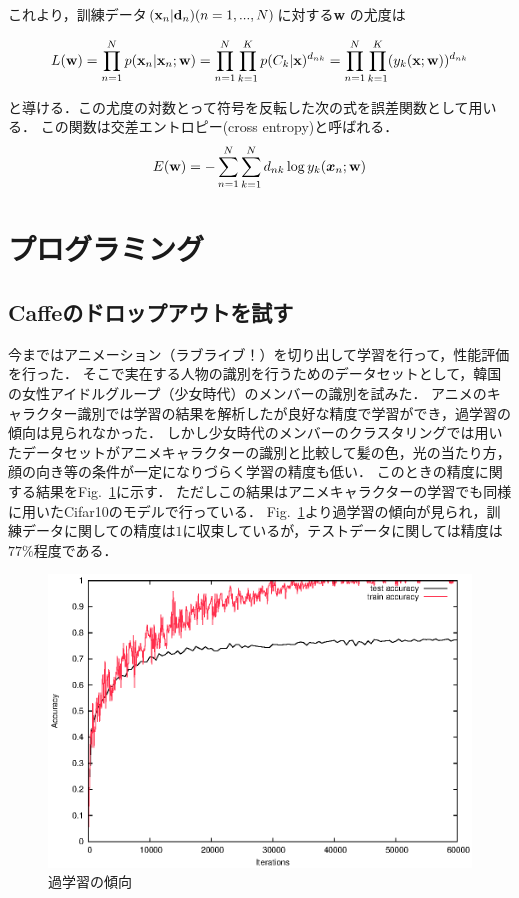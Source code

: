 \documentclass[a4paper,10pt]{jsarticle}
\def\vec#1{\mbox{\boldmath$#1$}}
\begin{document}
これより，訓練データ${({\bf x}_n|{\bf d}_n)}(n=1,...,N)$に対する{\bf w}
の尤度は

\begin{equation}
 L({\bf w})=\prod_{n=1}^{N}p({\bf x}_n|{\bf x}_n;{\bf
	w})=\prod_{n=1}^{N}\prod_{k=1}^{K}p(C_k|{\bf
	x})^{d_{nk}}=\prod_{n=1}^{N}\prod_{k=1}^{K}(y_k({\bf x};{\bf w}))^{d_{nk}}
\end{equation}

と導ける．この尤度の対数とって符号を反転した次の式を誤差関数として用いる．
この関数は交差エントロピー(cross entropy)と呼ばれる．
\begin{eqnarray}
 E({\bf w})=-\sum^{N}_{n=1}\sum^{N}_{k=1}d_{nk}\log
	y_{k}(\vec{x}_{n};{\bf w})
\end{eqnarray}


\section{プログラミング}
\subsection{Caffeのドロップアウトを試す}
今まではアニメーション（ラブライブ！）を切り出して学習を行って，性能評価を行った．
そこで実在する人物の識別を行うためのデータセットとして，韓国の女性アイドルグループ（少女時代）のメンバーの識別を試みた．
アニメのキャラクター識別では学習の結果を解析したが良好な精度で学習ができ，過学習の傾向は見られなかった．
しかし少女時代のメンバーのクラスタリングでは用いたデータセットがアニメキャラクターの識別と比較して髪の色，光の当たり方，顔の向き等の条件が一定になりづらく学習の精度も低い．
このときの精度に関する結果をFig.~\ref{fig:過学習の傾向}に示す．
ただしこの結果はアニメキャラクターの学習でも同様に用いたCifar10のモデルで行っている．
Fig.~\ref{fig:過学習の傾向}より過学習の傾向が見られ，訓練データに関しての精度は$1$に収束しているが，テストデータに関しては精度は$77\%$程度である．

\begin{figure}[tb]
  \begin{center}
    \includegraphics[clip,width=12cm]{./fig/eps/overtraining.eps}
  \end{center}
  \caption{過学習の傾向}
  \label{fig:過学習の傾向}
\end{figure}
\end{document}
